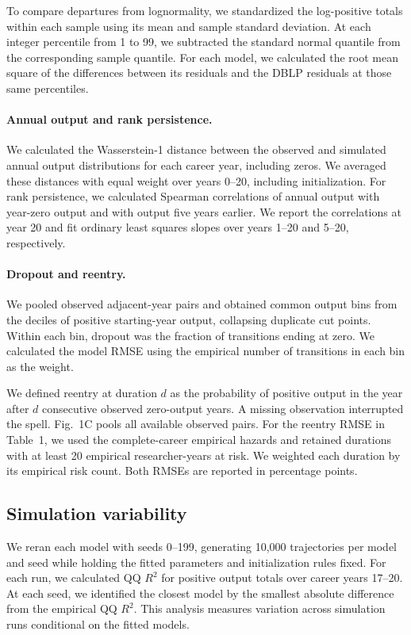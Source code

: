 \documentclass[9pt,twoside,lineno]{pnas-new}
\begin{document}
To compare departures from lognormality, we standardized the log-positive
totals within each sample using its mean and sample standard deviation.
At each integer percentile from 1 to 99, we subtracted the standard
normal quantile from the corresponding sample quantile. For each model,
we calculated the root mean square of the differences between its
residuals and the DBLP residuals at those same percentiles.

\paragraph{Annual output and rank persistence.}
We calculated the Wasserstein-1 distance between the observed and
simulated annual output distributions for each career year, including
zeros. We averaged these distances with equal weight over years 0--20,
including initialization. For rank persistence, we calculated Spearman
correlations of annual output with year-zero output and with output
five years earlier. We report the correlations at year 20 and fit
ordinary least squares slopes over years 1--20 and 5--20, respectively.

\paragraph{Dropout and reentry.}
We pooled observed adjacent-year pairs and obtained common output bins
from the deciles of positive starting-year output, collapsing duplicate
cut points. Within each bin, dropout was the fraction of transitions
ending at zero. We calculated the model RMSE using the empirical number
of transitions in each bin as the weight.

We defined reentry at duration $d$ as the probability of positive
output in the year after $d$ consecutive observed zero-output years.
A missing observation interrupted the spell. Fig.~1C pools all
available observed pairs. For the reentry RMSE in Table~1, we used
the complete-career empirical hazards and retained durations with
at least 20 empirical researcher-years at risk. We weighted each
duration by its empirical risk count. Both RMSEs are reported in
percentage points.

\subsection*{Simulation variability}

We reran each model with seeds 0--199, generating 10,000 trajectories
per model and seed while holding the fitted parameters and initialization
rules fixed. For each run, we calculated QQ $R^2$ for positive output
totals over career years 17--20. At each seed, we identified the closest
model by the smallest absolute difference from the empirical
QQ $R^2$. This analysis measures variation across simulation runs
conditional on the fitted models.


\FloatBarrier
\end{document}
